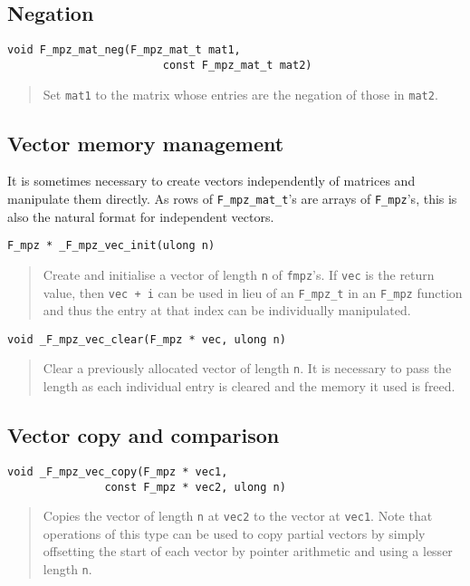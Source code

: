 \documentclass[a4paper,10pt]{article}
\newcommand{\code}{\lstinline}
\begin{document}
\subsection{Negation}

\begin{lstlisting}
void F_mpz_mat_neg(F_mpz_mat_t mat1, 
                        const F_mpz_mat_t mat2)
\end{lstlisting}
\begin{quote}
Set \code{mat1} to the matrix whose entries are the negation of those in \code{mat2}.
\end{quote}

\subsection{Vector memory management}

It is sometimes necessary to create vectors independently of matrices and manipulate them directly. As rows
of \code{F_mpz_mat_t}'s are arrays of \code{F_mpz}'s, this is also the natural format for independent vectors.

\begin{lstlisting}
F_mpz * _F_mpz_vec_init(ulong n)
\end{lstlisting}
\begin{quote}
Create and initialise a vector of length \code{n} of \code{fmpz}'s. If \code{vec} is the return value, then
\code{vec + i} can be used in lieu of an \code{F_mpz_t} in an \code{F_mpz} function and thus the entry at 
that index can be individually manipulated.
\end{quote}

\begin{lstlisting}
void _F_mpz_vec_clear(F_mpz * vec, ulong n)
\end{lstlisting}
\begin{quote}
Clear a previously allocated vector of length \code{n}. It is necessary to pass the length as each 
individual entry is cleared and the memory it used is freed.
\end{quote}

\subsection{Vector copy and comparison}

\begin{lstlisting}
void _F_mpz_vec_copy(F_mpz * vec1, 
               const F_mpz * vec2, ulong n)
\end{lstlisting}
\begin{quote}
Copies the vector of length \code{n} at \code{vec2} to the vector at \code{vec1}. Note that operations of
this type can be used to copy partial vectors by simply offsetting the start of each vector by pointer
arithmetic and using a lesser length \code{n}.
\end{quote}
\end{document}
